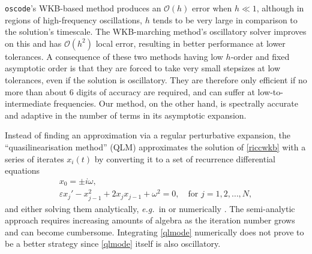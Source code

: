 \documentclass[10pt]{article}
\newcommand{\eg}{{\it e.g.\ }}
\newcommand{\bigO}{{\mathcal O}}
\newcommand{\om}{\omega}
\newcommand{\g}{\gamma}
\newcommand{\AB}[1]{{\color{orange}#1}}
\begin{document}
%
\texttt{oscode}'s WKB-based method produces an $\bigO(h)$
error when $h \ll 1$, although in regions of high-frequency oscillations, $h$
tends to be very large in comparison to the solution's timescale. The
WKB-marching method's oscillatory solver improves on this and has $\bigO(h^2)$ local error,
resulting in better performance at lower tolerances.
A consequence of these two methods having low $h$-order and fixed asymptotic
order is that they are forced to take very small stepsizes at low tolerances,
even if the solution is oscillatory. They are therefore only efficient if no more than about 6 digits of accuracy
are required, and can suffer at low-to-intermediate frequencies. Our method, on the other hand, is spectrally accurate and 
adaptive in the number of terms in its asymptotic expansion.


Instead of finding an approximation via a regular perturbative expansion, the
``quasilinearisation method''
(QLM) \cite{bellman1970} approximates the solution
of \cref{riccwkb} with a series of iterates $x_i(t)$ by converting it to a set
of recurrence differential equations
\begin{gather}\label{qlmode}
x_0 = \pm i\om, \\
    \varepsilon x_j' - x_{j-1}^2 + 2x_j x_{j-1} + \om^2 = 0, \quad \text{for } j = 1, 2, \ldots, N, 
\end{gather}
and either solving them analytically, \eg in \cite{mandelzweig2004,krivec2006}
or numerically \cite{krivec2008,krivec2014}. The semi-analytic approach
requires increasing amounts of algebra as the iteration number grows and can
become cumbersome. Integrating \cref{qlmode} numerically does not prove to be a better strategy 
since \cref{qlmode} itself is also oscillatory. 
\end{document}
